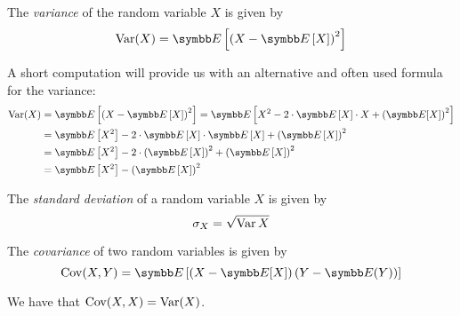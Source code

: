 \begin{definition}[Variance]
The \emph{variance} of the random variable \(X\) is given by
\[
    \variance(X) = \expectedvalue\left[\left(X - \expectedvalue\left[X\right]\right)^2\right]
\]
\end{definition}

\begin{remark*}
A short computation will provide us with an alternative and often used formula for the variance:
\begin{align*}
    \variance(X) &= \expectedvalue\left[\left(X - \expectedvalue\left[X\right]\right)^2\right] = \expectedvalue\left[X^2 - 2 \cdot \expectedvalue\left[X\right] \cdot X + \left(\expectedvalue[X]\right)^2\right] \\
    &= \expectedvalue\left[X^2\right] - 2 \cdot \expectedvalue\left[X\right] \cdot \expectedvalue\left[X\right] + \left(\expectedvalue\left[X\right]\right)^2 \\
    &= \expectedvalue\left[X^2\right] - 2 \cdot \left(\expectedvalue\left[X\right]\right)^2 + \left(\expectedvalue\left[X\right]\right)^2 \\
    &= \expectedvalue\left[X^2\right] - \left(\expectedvalue\left[X\right]\right)^2
\end{align*}
\end{remark*}

\begin{definition}
The \emph{standard deviation} of a random variable \(X\) is given by
\[
    \sigma_X = \sqrt{\operatorname{Var}{X}}
\]
\end{definition}

\begin{definition}[Covariance]
The \emph{covariance} of two random variables is given by
\[
    \covariance(X, Y) = \expectedvalue\left[\left(X - \expectedvalue[X]\right) \left(Y - \expectedvalue(Y)\right)\right]
\]
\end{definition}

\begin{remark*}
We have that \(\operatorname{Cov}(X, X) = \operatorname{Var}(X)\).
\end{remark*}


